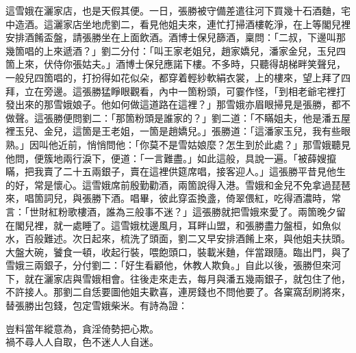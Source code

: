 這雪娥在灑家店，也是天假其便。一日，張勝被守備差遣往河下買幾十石酒麯，宅中造酒。這灑家店坐地虎劉二，看見他姐夫來，連忙打掃酒樓乾淨，在上等閣兒裡安排酒餚盃盤，請張勝坐在上面飲酒。酒博士保兒篩酒，稟問：「二叔，下邊叫那幾箇唱的上來遞酒？」劉二分付：「叫王家老姐兒，趙家嬌兒，潘家金兒，玉兒四箇上來，伏侍你張姑夫。」酒博士保兒應諾下樓。不多時，只聽得胡梯畔笑聲兒，一般兒四箇唱的，打扮得如花似朵，都穿着輕紗軟絹衣裳，上的樓來，望上拜了四拜，立在旁邊。這張勝猛睜眼觀看，內中一箇粉頭，可霎作怪，「到相老爺宅裡打發出來的那雪娥娘子。他如何做這道路在這裡？」那雪娥亦眉眼掃見是張勝，都不做聲。這張勝便問劉二：「那箇粉頭是誰家的？」劉二道：「不瞞姐夫，他是潘五屋裡玉兒、金兒，這箇是王老姐，一箇是趙嬌兒。」張勝道：「這潘家玉兒，我有些眼熟。」因叫他近前，悄悄問他：「你莫不是雪姑娘麼？怎生到於此處？」那雪娥聽見他問，便簇地兩行淚下，便道：「一言難盡。」如此這般，具說一遍。「被薛嫂攛瞞，把我賣了二十五兩銀子，賣在這裡供筵席唱，接客迎人。」這張勝平昔見他生的好，常是懷心。這雪娥席前殷勤勸酒，兩箇說得入港。雪娥和金兒不免拿過琵琶來，唱箇詞兒，與張勝下酒。唱畢，彼此穿盃換盞，倚翠偎紅，吃得酒濃時，常言：「世財紅粉歌樓酒，誰為三般事不迷？」這張勝就把雪娥來愛了。兩箇晚夕留在閣兒裡，就一處睡了。這雪娥枕邊風月，耳畔山盟，和張勝盡力盤桓，如魚似水，百般難述。次日起來，梳洗了頭面，劉二又早安排酒餚上來，與他姐夫扶頭。大盤大碗，饕食一頓，收起行裝，喂飽頭口，裝載米麯，伴當跟隨。臨出門，與了雪娥三兩銀子，分付劉二：「好生看顧他，休教人欺負。」自此以後，張勝但來河下，就在灑家店與雪娥相會。往後走來走去，每月與潘五幾兩銀子，就包住了他，不許接人。那劉二自恁要圖他姐夫歡喜，連房錢也不問他要了。各窠窩刮刷將來，替張勝出包錢，包定雪娥柴米。有詩為證：

\begin{myquote}
豈料當年縱意為，貪淫倚勢把心欺。\\禍不尋人人自取，色不迷人人自迷。
\end{myquote}


